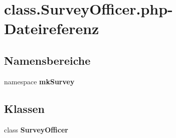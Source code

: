 \section{class.SurveyOfficer.php-Dateireferenz}
\label{class_8SurveyOfficer_8php}
\subsection*{Namensbereiche}
\begin{CompactItemize}
\item 
namespace {\bf mkSurvey}
\end{CompactItemize}
\subsection*{Klassen}
\begin{CompactItemize}
\item 
class {\bf SurveyOfficer}
\end{CompactItemize}
